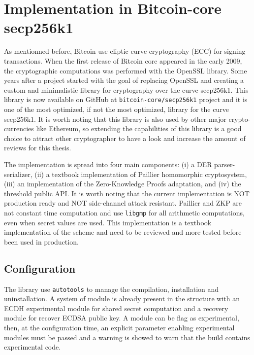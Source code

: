 \chapter{Implementation in Bitcoin-core secp256k1}
\label{chap:implementation-secp256k1}

As mentionned before, Bitcoin use eliptic curve cryptography (ECC) for signing transactions.
When the first release of Bitcoin core appeared in the early 2009, the cryptographic
computations was performed with the OpenSSL library. Some years after a project
started with the goal of replacing OpenSSL and creating a custom and minimalistic
library for cryptography over the curve secp256k1. This library is now available
on GitHub at \texttt{bitcoin-core/secp256k1} project and it is one of the most optimized,
if not the most optimized, library for the curve secp256k1. It is worth noting that
this library is also used by other major crypto-currencies like Ethereum, so extending
the capabilities of this library is a good choice to attract other cryptographer
to have a look and increase the amount of reviews for this thesis.

The implementation is spread into four main components: (i) a DER parser-serializer,
(ii) a textbook implementation of Paillier homomorphic cryptosystem, (iii) an
implementation of the Zero-Knowledge Proofs adaptation, and (iv) the threshold
public API. It is worth noting that the current implementation is NOT production
ready and NOT side-channel attack resistant. Paillier and ZKP are not constant
time computation and use \texttt{libgmp} for all arithmetic computations, even
when secret values are used. This implementation is a textbook implementation
of the scheme and need to be reviewed and more tested before been used in production.

\minitoc

\newpage

\section{Configuration}

The library use \texttt{autotools} to manage the compilation, installation and
uninstallation. A system of module is already present in the structure with an
ECDH experimental module for shared secret computation and a recovery module for
recover ECDSA public key. A module can be flag as experimental, then, at the
configuration time, an explicit parameter enabling experimental modules must be
passed and a warning is showed to warn that the build contains experimental code.

